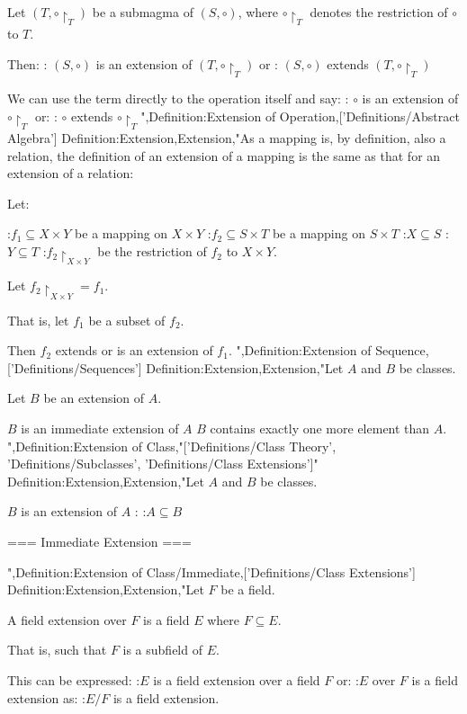 Let $\left({T, \circ \restriction_T}\right)$ be a submagma of $\left({S, \circ}\right)$, where $\circ \restriction_T$ denotes the restriction of $\circ$ to $T$.


Then:
: $\left({S, \circ}\right)$ is an extension of $\left({T, \circ \restriction_T}\right)$
or
: $\left({S, \circ}\right)$ extends $\left({T, \circ \restriction_T}\right)$


We can use the term directly to the operation itself and say:
: $\circ$ is an extension of $\circ \restriction_T$
or:
: $\circ$ extends $\circ \restriction_T$",Definition:Extension of Operation,['Definitions/Abstract Algebra']
Definition:Extension,Extension,"As a mapping is, by definition, also a relation, the definition of an extension of a mapping is the same as that for an extension of a relation:

Let:

:$f_1 \subseteq X \times Y$ be a mapping on $X \times Y$
:$f_2 \subseteq S \times T$ be a mapping on $S \times T$
:$X \subseteq S$
:$Y \subseteq T$
:$f_2 \restriction_{X \times Y}$ be the restriction of $f_2$ to $X \times Y$.


Let $f_2 \restriction_{X \times Y} = f_1$.

That is, let $f_1$ be a subset of $f_2$.


Then $f_2$ extends or is an extension of $f_1$.
",Definition:Extension of Sequence,['Definitions/Sequences']
Definition:Extension,Extension,"Let $A$ and $B$ be classes.

Let $B$ be an extension of $A$.

$B$ is an immediate extension of $A$  $B$ contains exactly one more element than $A$.
",Definition:Extension of Class,"['Definitions/Class Theory', 'Definitions/Subclasses', 'Definitions/Class Extensions']"
Definition:Extension,Extension,"Let $A$ and $B$ be classes.

$B$ is an extension of $A$ :
:$A \subseteq B$


=== Immediate Extension ===

",Definition:Extension of Class/Immediate,['Definitions/Class Extensions']
Definition:Extension,Extension,"Let $F$ be a field.


A field extension over $F$ is a field $E$ where $F \subseteq E$.

That is, such that $F$ is a subfield of $E$.


This can be expressed:
:$E$ is a field extension over a field $F$
or:
:$E$ over $F$ is a field extension 
as:
:$E / F$ is a field extension.  


